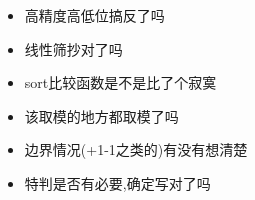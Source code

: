 \noindent
\begin{itemize}
    \item 高精度高低位搞反了吗
    \item 线性筛抄对了吗
    \item sort比较函数是不是比了个寂寞
    \item 该取模的地方都取模了吗
    \item 边界情况(+1-1之类的)有没有想清楚
    \item 特判是否有必要,确定写对了吗
\end{itemize}